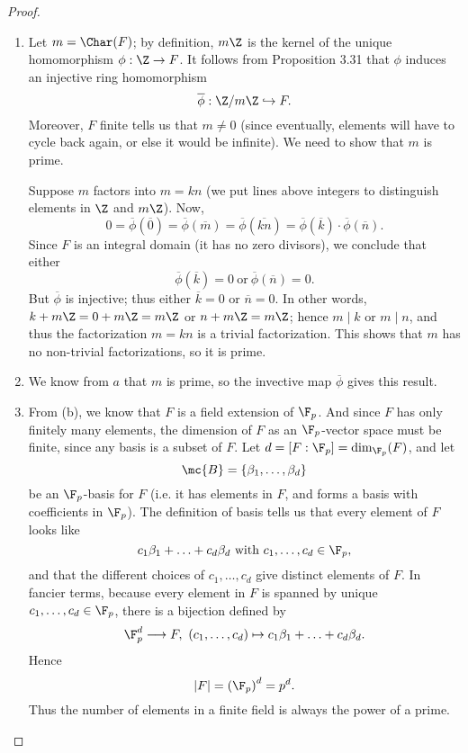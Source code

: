 \documentclass[math1530-lecture-notes]{subfiles}
\begin{document}
\begin{proof}[Proof]
  \begin{enumerate}
    \item Let $m=\Char(F)$; by definition, $m\Z$ is the kernel of the unique homomorphism
      $\phi:\Z\to F$. It follows from Proposition 3.31 that $\phi$ induces an injective ring
      homomorphism \[
        \overline{\phi}: \Z / m\Z \hookrightarrow F
      .\] Moreover, $F$ finite tells us that $m\neq 0$ (since eventually, elements will have to
      cycle back again, or else it would be infinite). We need to show that $m$ is prime.

      Suppose $m$ factors into $m=kn$ (we put lines above integers to distinguish elements in $\Z$
      and $m\Z$). Now, \[
        0=\overline{\phi}(\overline{0})=\overline{\phi}(\overline{m})=\overline{\phi}(\overline{kn})=\overline{\phi}(\overline{k})\cdot
        \overline{\phi}(\overline{n})
      .\] Since $F$ is an integral domain (it has no zero divisors), we conclude that either \[
      \overline{\phi}(\overline{k})=0 ~\text{or}~\overline{\phi}(\overline{n})=0
      .\] But $\overline{\phi}$ is injective; thus either $\overline{k}=0$ or $\overline{n}=0$. In
      other words, $k+m\Z=0+m\Z=m\Z$ or $n+m\Z=m\Z$; hence $m\mid k$ or $m\mid n$, and thus the
      factorization $m=kn$ is a trivial factorization. This shows that $m$ has no non-trivial
      factorizations, so it is prime.
    \item We know from $a$ that $m$ is prime, so the invective map $\overline{\phi}$ gives this
      result.
    \item From (b), we know that $F$ is a field extension of $\F_p$. And since $F$ has only finitely
      many elements, the dimension of $F$ as an $\F_p$-vector space must be finite, since any basis
      is a subset of $F$. Let $d=\left[F : \F_p\right]=\dim_{\F_p}(F)$, and let \[
        \mc{B}=\{ \beta_1,\ldots,\beta_d \}
      \] be an $\F_p$-basis for $F$ (i.e. it has elements in $F$, and forms a basis with
      coefficients in $\F_p$). The definition of basis tells us that every element of $F$ looks like
      \[
        c_1\beta_1+\ldots+c_d\beta_d ~\text{with}~ c_1,\ldots,c_d\in \F_p
      ,\] and that the different choices of $c_1,\ldots,c_d$ give distinct elements of $F$. In
      fancier terms, because every element in $F$ is spanned by unique $c_1,\ldots,c_d\in \F_p$,
      there is a bijection defined by \[
        \F_p^d \longrightarrow F,\ (c_1,\ldots,c_d)\mapsto c_1\beta_1+\ldots+c_d\beta_d
      .\] Hence \[
        \left| F \right| = \left( \F_p \right) ^d=p^d
      .\] Thus the number of elements in a finite field is always the power of a prime.
  \end{enumerate}
\end{proof}
\end{document}
